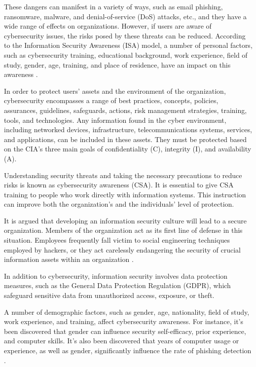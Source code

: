 \documentclass[journal]{IEEEtran}
\begin{document}
These dangers can manifest in a variety of ways, such as email phishing, ransomware, malware, and denial-of-service (DoS) attacks, etc., and they have a wide range of effects on organizations. However, if users are aware of cybersecurity issues, the risks posed by these threats can be reduced. According to the Information Security Awareness (ISA) model, a number of personal factors, such as cybersecurity training, educational background, work experience, field of study, gender, age, training, and place of residence, have an impact on this awareness \cite{Edu_article1}. 

In order to protect users' assets and the environment of the organization, cybersecurity encompasses a range of best practices, concepts, policies, assurances, guidelines, safeguards, actions, risk management strategies, training, tools, and technologies. Any information found in the cyber environment, including networked devices, infrastructure, telecommunications systems, services, and applications, can be included in these assets. They must be protected based on the CIA's three main goals of confidentiality (C), integrity (I), and availability (A).

Understanding security threats and taking the necessary precautions to reduce risks is known as cybersecurity awareness (CSA). It is essential to give CSA training to people who work directly with information systems. This instruction can improve both the organization's and the individuals' level of protection.

It is argued that developing an information security culture will lead to a secure organization. Members of the organization act as its first line of defense in this situation. Employees frequently fall victim to social engineering techniques employed by hackers, or they act carelessly endangering the security of crucial information assets within an organization \cite{Steps_article2}.

In addition to cybersecurity, information security involves data protection measures, such as the General Data Protection Regulation (GDPR), which safeguard sensitive data from unauthorized access, exposure, or theft.

A number of demographic factors, such as gender, age, nationality, field of study, work experience, and training, affect cybersecurity awareness. For instance, it's been discovered that gender can influence security self-efficacy, prior experience, and computer skills. It's also been discovered that years of computer usage or experience, as well as gender, significantly influence the rate of phishing detection \cite{Edu_article1}.
\end{document}
